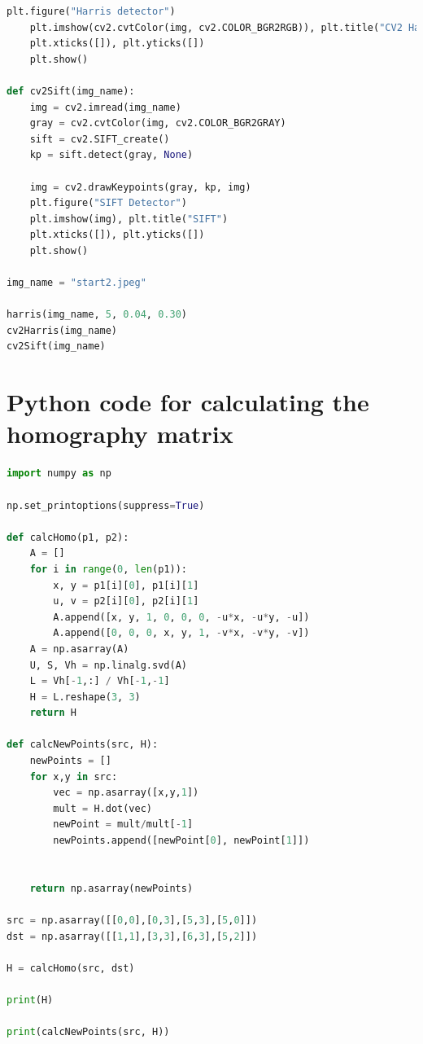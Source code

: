 \documentclass{article}
\begin{document}
\begin{appendices}
\begin{lstlisting}[language=Python]
    plt.figure("Harris detector")
    plt.imshow(cv2.cvtColor(img, cv2.COLOR_BGR2RGB)), plt.title("CV2 Harris")
    plt.xticks([]), plt.yticks([])
    plt.show()

def cv2Sift(img_name):
    img = cv2.imread(img_name)
    gray = cv2.cvtColor(img, cv2.COLOR_BGR2GRAY)
    sift = cv2.SIFT_create()
    kp = sift.detect(gray, None)

    img = cv2.drawKeypoints(gray, kp, img)
    plt.figure("SIFT Detector")
    plt.imshow(img), plt.title("SIFT")
    plt.xticks([]), plt.yticks([])
    plt.show()

img_name = "start2.jpeg"

harris(img_name, 5, 0.04, 0.30)
cv2Harris(img_name)
cv2Sift(img_name)

        \end{lstlisting}
    \section{Python code for calculating the homography matrix}
    \label{appendix:homo}
    \begin{lstlisting}[language=Python]
import numpy as np

np.set_printoptions(suppress=True)

def calcHomo(p1, p2):
    A = []
    for i in range(0, len(p1)):
        x, y = p1[i][0], p1[i][1]
        u, v = p2[i][0], p2[i][1]
        A.append([x, y, 1, 0, 0, 0, -u*x, -u*y, -u])
        A.append([0, 0, 0, x, y, 1, -v*x, -v*y, -v])
    A = np.asarray(A)
    U, S, Vh = np.linalg.svd(A)
    L = Vh[-1,:] / Vh[-1,-1]
    H = L.reshape(3, 3)
    return H

def calcNewPoints(src, H):
    newPoints = []
    for x,y in src:
        vec = np.asarray([x,y,1])
        mult = H.dot(vec)
        newPoint = mult/mult[-1]
        newPoints.append([newPoint[0], newPoint[1]])

        
    return np.asarray(newPoints)

src = np.asarray([[0,0],[0,3],[5,3],[5,0]])
dst = np.asarray([[1,1],[3,3],[6,3],[5,2]])

H = calcHomo(src, dst)

print(H)

print(calcNewPoints(src, H))
        
        
    \end{lstlisting}

    \end{appendices}
\end{document}
